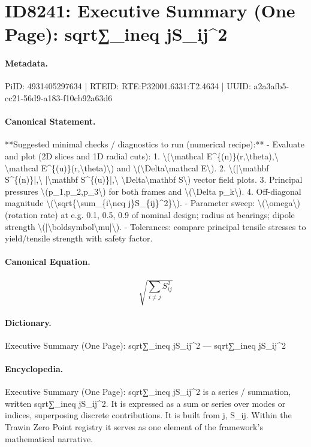 \section*{ID8241: Executive Summary (One Page): sqrt∑\_ineq jS\_ij\textasciicircum{}2}
\paragraph{Metadata.}
PiID: 4931405297634 | RTEID: RTE:P32001.6331:T2.4634 | UUID: a2a3afb5-cc21-56d9-a183-f10cb92a63d6

\paragraph{Canonical Statement.}
**Suggested minimal checks / diagnostics to run (numerical recipe):** - Evaluate and plot (2D slices and 1D radial cuts): 1. \textbackslash{}(\textbackslash{}mathcal E\textasciicircum{}\{(n)\}(r,\textbackslash{}theta),\textbackslash{} \textbackslash{}mathcal E\textasciicircum{}\{(u)\}(r,\textbackslash{}theta)\textbackslash{}) and \textbackslash{}(\textbackslash{}Delta\textbackslash{}mathcal E\textbackslash{}). 2. \textbackslash{}(|\textbackslash{}mathbf S\textasciicircum{}\{(n)\}|,\textbackslash{} |\textbackslash{}mathbf S\textasciicircum{}\{(u)\}|,\textbackslash{} \textbackslash{}Delta\textbackslash{}mathbf S\textbackslash{}) vector field plots. 3. Principal pressures \textbackslash{}(p\_1,p\_2,p\_3\textbackslash{}) for both frames and \textbackslash{}(\textbackslash{}Delta p\_k\textbackslash{}). 4. Off-diagonal magnitude \textbackslash{}(\textbackslash{}sqrt\{\textbackslash{}sum\_\{i\textbackslash{}neq j\}S\_\{ij\}\textasciicircum{}2\}\textbackslash{}). - Parameter sweep: \textbackslash{}(\textbackslash{}omega\textbackslash{}) (rotation rate) at e.g. 0.1, 0.5, 0.9 of nominal design; radius at bearings; dipole strength \textbackslash{}(|\textbackslash{}boldsymbol\textbackslash{}mu|\textbackslash{}). - Tolerances: compare principal tensile stresses to yield/tensile strength with safety factor.

\paragraph{Canonical Equation.}
\[
\sqrt{\sum_{i\neq j}S_{ij}^2}
\]

\paragraph{Dictionary.}
Executive Summary (One Page): sqrt∑\_ineq jS\_ij\textasciicircum{}2 — sqrt∑\_ineq jS\_ij\textasciicircum{}2

\paragraph{Encyclopedia.}
Executive Summary (One Page): sqrt∑\_ineq jS\_ij\textasciicircum{}2 is a series / summation, written sqrt∑\_ineq jS\_ij\textasciicircum{}2. It is expressed as a sum or series over modes or indices, superposing discrete contributions. It is built from j, S\_ij. Within the Trawin Zero Point registry it serves as one element of the framework's mathematical narrative.
